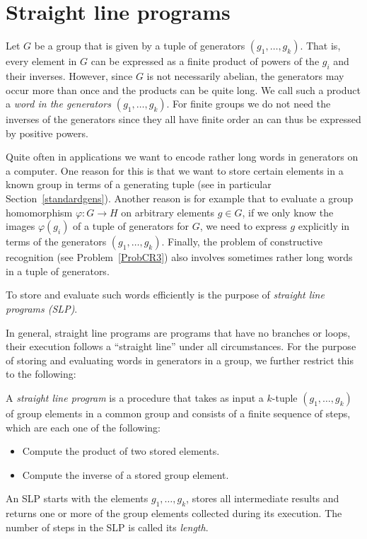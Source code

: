 \section{Straight line programs}
\label{slp}

Let $G$ be a group that is given by a tuple of generators $(g_1,
\ldots, g_k)$. That is, every element in $G$ can be expressed as a
finite product of powers of the $g_i$ and their inverses. However,
since $G$ is not necessarily abelian, the generators may occur more
than once and the products can be quite long. We call such a product a 
\emph{word in the generators $(g_1, \ldots, g_k)$}. 
For finite groups we do not need the
inverses of the generators since they all have finite order an can
thus be expressed by positive powers.

Quite often in applications we want to encode rather long words in
generators on a computer. One reason for this is that we want to store certain
elements in a known group in terms of a generating tuple (see in
particular Section~\ref{standardgens}). Another reason is for example that to
evaluate a group homomorphism $\varphi:G \to H$ on arbitrary elements
$g \in G$, if we only know the images $\varphi(g_i)$ of a tuple of
generators for $G$, we need to express $g$ explicitly in terms of
the generators $(g_1, \ldots, g_k)$. Finally, the problem of constructive
recognition (see Problem~\ref{ProbCR3}) also involves sometimes rather
long words in a tuple of generators.

To store and evaluate such words efficiently is the purpose of
\emph{straight line programs (SLP)}.

In general, straight line programs are programs that have no branches
or loops, their execution follows a ``straight line'' under all
circumstances. For the purpose of storing and evaluating words in
generators in a group, we further restrict this to the following:

\begin{Def}
    \label{defslp}
    A \emph{straight line program} is a procedure that takes as input a
    $k$-tuple $(g_1, \ldots, g_k)$ of group elements in a 
    common group and consists of a finite 
    sequence of steps, which are each one of the following:
\begin{itemize}
    \item Compute the product of two stored elements.
    \item Compute the inverse of a stored group element.
\end{itemize}
    An SLP starts with the elements $g_1, \ldots, g_k$,
    stores all intermediate results and returns one or more of the 
    group elements collected during its execution. The number of
    steps in the SLP is called its \emph{length}.
\end{Def}

